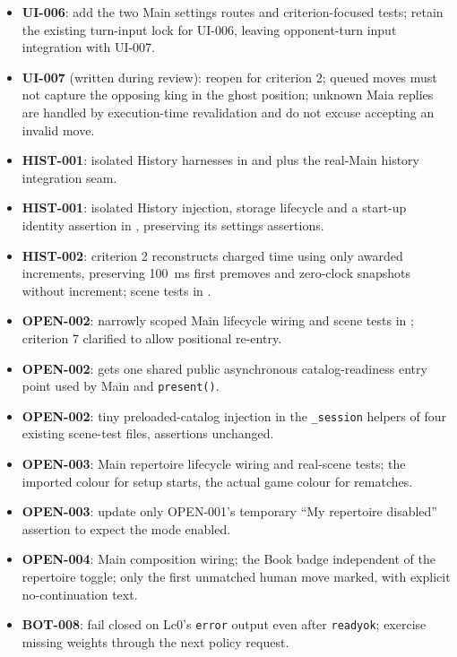 \documentclass[11pt,a4paper]{article}
\begin{document}
\begin{itemize}
  \item \textbf{UI-006}: add the two Main settings routes and criterion-focused tests; retain
        the existing turn-input lock for UI-006, leaving opponent-turn input integration with
        UI-007.
  \item \textbf{UI-007} (written during review): reopen for criterion 2; queued moves must not
        capture the opposing king in the ghost position; unknown Maia replies are handled by
        execution-time revalidation and do not excuse accepting an invalid move.
  \item \textbf{HIST-001}: isolated History harnesses in  and
         plus the real-Main history integration seam.
  \item \textbf{HIST-001}: isolated History injection, storage lifecycle and a start-up
        identity assertion in , preserving its settings assertions.
  \item \textbf{HIST-002}: criterion 2 reconstructs charged time using only awarded
        increments, preserving 100~ms first premoves and zero-clock snapshots without
        increment; scene tests in .
  \item \textbf{OPEN-002}: narrowly scoped Main lifecycle wiring and scene tests in
        ; criterion 7 clarified to allow positional re-entry.
  \item \textbf{OPEN-002}:  gets one shared public asynchronous
        catalog-readiness entry point used by Main and \texttt{present()}.
  \item \textbf{OPEN-002}: tiny preloaded-catalog injection in the \texttt{\_session} helpers
        of four existing scene-test files, assertions unchanged.
  \item \textbf{OPEN-003}: Main repertoire lifecycle wiring and real-scene tests; the imported
        colour for setup starts, the actual game colour for rematches.
  \item \textbf{OPEN-003}: update only OPEN-001's temporary ``My repertoire disabled''
        assertion to expect the mode enabled.
  \item \textbf{OPEN-004}: Main composition wiring; the Book badge independent of the
        repertoire toggle; only the first unmatched human move marked, with explicit
        no-continuation text.
  \item \textbf{BOT-008}: fail closed on Lc0's \texttt{error} output even after
        \texttt{readyok}; exercise missing weights through the next policy request.
\end{itemize}
\end{document}
